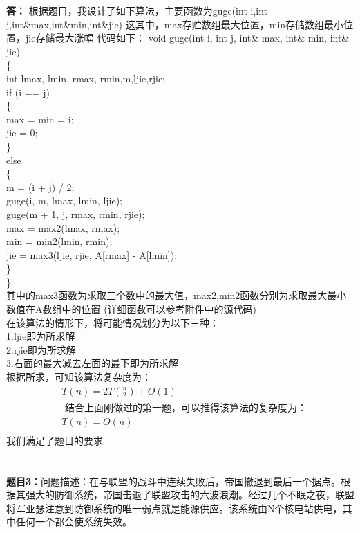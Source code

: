 \documentclass[12pt,a4paper]{article}
\begin{document}
\noindent
{\bf 答：}
根据题目，我设计了如下算法，主要函数为guge(int i,int j,int\&max,int\&min,int\&jie)
这其中，max存贮数组最大位置，min存储数组最小位置，jie存储最大涨幅
代码如下：
void guge(int i, int j, int\& max, int\& min, int\& jie)  \\
\{ \\
	int lmax, lmin, rmax, rmin,m,ljie,rjie; \\
	if (i == j) \\
	\{ \\
		max = min = i; \\
		jie = 0; \\
	\} \\ 
	else \\ 
	\{ \\ 
		m = (i + j) / 2; \\
		guge(i, m, lmax, lmin, ljie); \\
		guge(m + 1, j, rmax, rmin, rjie); \\
		max = max2(lmax, rmax); \\ 
		min = min2(lmin, rmin);  \\ 
		jie = max3(ljie, rjie, A[rmax] - A[lmin]); \\
 	\} \\
\} \\
其中的max3函数为求取三个数中的最大值，max2,min2函数分别为求取最大最小数值在A数组中的位置 (详细函数可以参考附件中的源代码)\\
在该算法的情形下，将可能情况划分为以下三种：\\
1.ljie即为所求解 \\
2.rjie即为所求解 \\
3.右面的最大减去左面的最下即为所求解 \\
根据所求，可知该算法复杂度为：
$$
\begin{aligned}
&T(n)=2T\left(\frac{n}{2}\right)+O(1)\\
&\text { 结合上面刚做过的第一题，可以推得该算法的复杂度为：} \\ 
&T(n)=O(n) \\
\end{aligned}
$$
我们满足了题目的要求 \\
\noindent
\section*{\heiti \color{red}{算法实现题}}
\vspace{10pt}
\noindent
{\bf 题目3：}问题描述：在与联盟的战斗中连续失败后，帝国撤退到最后一个据点。根据其强大的防御系统，帝国击退了联盟攻击的六波浪潮。经过几个不眠之夜，联盟将军亚瑟注意到防御系统的唯一弱点就是能源供应。该系统由N个核电站供电，其中任何一个都会使系统失效。
\end{document}
